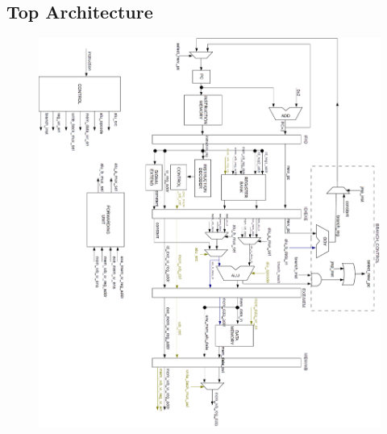 \documentclass{article}
\begin{document}
  \subsection{Top Architecture}
     \begin{figure}[H]
    \centering
    \includegraphics[width=\linewidth]{pictures/top_architecture.png}
  \end{figure}
   

    
\end{document}

